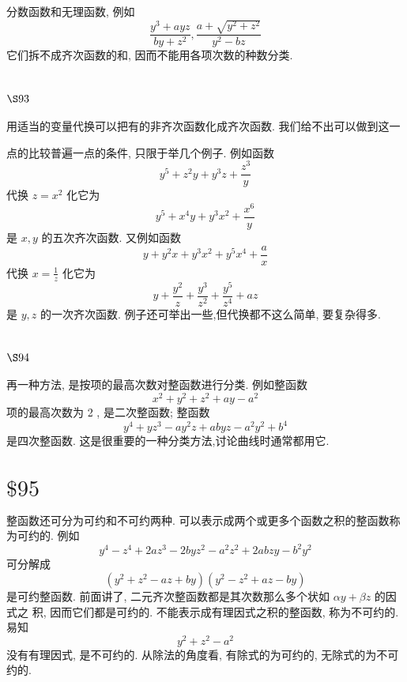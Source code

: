分数函数和无理函数, 例如
\[
\frac{y^{3}+a y z}{b y+z^{2}}, \frac{a+\sqrt{y^{2}+z^{2}}}{y^{2}-b z}
\]
它们拆不成齐次函数的和, 因而不能用各项次数的种数分类.

\section{$\S 93$}

用适当的变量代换可以把有的非齐次函数化成齐次函数. 我们给不出可以做到这一 

点的比较普遍一点的条件, 只限于举几个例子. 例如函数
\[
y^{5}+z^{2} y+y^{3} z+\frac{z^{3}}{y}
\]
代换 $z=x^{2}$ 化它为
\[
y^{5}+x^{4} y+y^{3} x^{2}+\frac{x^{6}}{y}
\]
是 $x, y$ 的五次齐次函数. 又例如函数
\[
y+y^{2} x+y^{3} x^{2}+y^{5} x^{4}+\frac{a}{x}
\]
代换 $x=\frac{1}{z}$ 化它为
\[
y+\frac{y^{2}}{z}+\frac{y^{3}}{z^{2}}+\frac{y^{5}}{z^{4}}+a z
\]
是 $y, z$ 的一次齐次函数. 例子还可举出一些,但代换都不这么简单, 要复杂得多.

\section{$\S 94$}

再一种方法, 是按项的最高次数对整函数进行分类. 例如整函数
\[
x^{2}+y^{2}+z^{2}+a y-a^{2}
\]
项的最高次数为 2 , 是二次整函数; 整函数
\[
y^{4}+y z^{3}-a y^{2} z+a b y z-a^{2} y^{2}+b^{4}
\]
是四次整函数. 这是很重要的一种分类方法,讨论曲线时通常都用它.

\section{$\$ 95$}

整函数还可分为可约和不可约两种. 可以表示成两个或更多个函数之积的整函数称 为可约的. 例如
\[
y^{4}-z^{4}+2 a z^{3}-2 b y z^{2}-a^{2} z^{2}+2 a b z y-b^{2} y^{2}
\]
可分解成
\[
\left(y^{2}+z^{2}-a z+b y\right)\left(y^{2}-z^{2}+a z-b y\right)
\]
是可约整函数. 前面讲了, 二元齐次整函数都是其次数那么多个状如 $\alpha y+\beta z$ 的因式之 积, 因而它们都是可约的. 不能表示成有理因式之积的整函数, 称为不可约的. 易知
\[
y^{2}+z^{2}-a^{2}
\]
没有有理因式, 是不可约的. 从除法的角度看, 有除式的为可约的, 无除式的为不可约的. 

